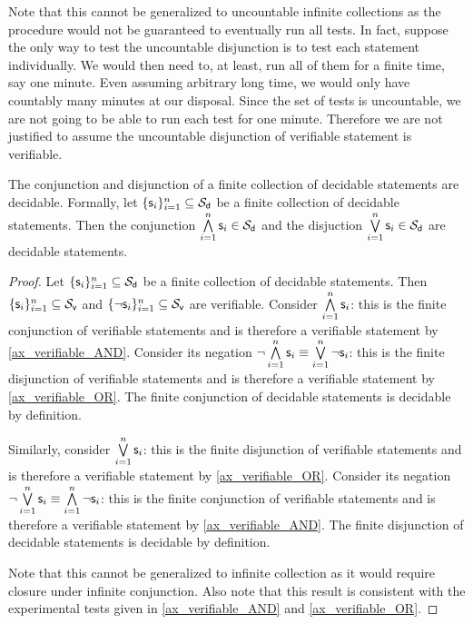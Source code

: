 \documentclass[11pt,letterpaper,fleqn]{memoir} %
\begin{document}
\begin{mathSection}
\begin{justification}
		Note that this cannot be generalized to uncountable infinite collections as the procedure would not be guaranteed to eventually run all tests. In fact, suppose the only way to test the uncountable disjunction is to test each statement individually. We would then need to, at least, run all of them for a finite time, say one minute. Even assuming arbitrary long time, we would only have countably many minutes at our disposal. Since the set of tests is uncountable, we are not going to be able to run each test for one minute. Therefore we are not justified to assume the uncountable disjunction of verifiable statement is verifiable.
	\end{justification}
	\begin{prop}\label{prop_decidable_AND_OR}
		The conjunction and disjunction of a finite collection of decidable statements are decidable. Formally, let $\{\mathsf{s}_i\}_{i=1}^{n} \subseteq \mathcal{S}_\textsf{d}$ be a finite collection of decidable statements. Then the conjunction $\bigwedge\limits_{i=1}^{n} \mathsf{s}_i \in \mathcal{S}_\textsf{d}$ and the disjuction $\bigvee\limits_{i=1}^{n} \mathsf{s}_i \in \mathcal{S}_\textsf{d}$ are decidable statements.
	\end{prop}
\begin{proof}
	Let $\{\mathsf{s}_i\}_{i=1}^{n} \subseteq \mathcal{S}_\textsf{d}$ be a finite collection of decidable statements. Then $\{\mathsf{s}_i\}_{i=1}^{n} \subseteq \mathcal{S}_\textsf{v}$ and $\{\neg\mathsf{s}_i\}_{i=1}^{n} \subseteq \mathcal{S}_\textsf{v}$ are verifiable. Consider $\bigwedge\limits_{i=1}^{n} \mathsf{s}_i$: this is the finite conjunction of verifiable statements and is therefore a verifiable statement by \ref{ax_verifiable_AND}. Consider its negation $\neg \bigwedge\limits_{i=1}^{n} \mathsf{s}_i \equiv \bigvee\limits_{i=1}^{n} \neg \mathsf{s}_i$: this is the finite disjunction of verifiable statements and is therefore a verifiable statement by \ref{ax_verifiable_OR}. The finite conjunction of decidable statements is decidable by definition.
	
	Similarly, consider $\bigvee\limits_{i=1}^{n} \mathsf{s}_i$: this is the finite disjunction of verifiable statements and is therefore a verifiable statement by \ref{ax_verifiable_OR}. Consider its negation $\neg \bigvee\limits_{i=1}^{n} \mathsf{s}_i \equiv \bigwedge\limits_{i=1}^{n} \neg \mathsf{s}_i$: this is the finite conjunction of verifiable statements and is therefore a verifiable statement by \ref{ax_verifiable_AND}. The finite disjunction of decidable statements is decidable by definition.
	
	Note that this cannot be generalized to infinite collection as it would require closure under infinite conjunction. Also note that this result is consistent with the experimental tests given in \ref{ax_verifiable_AND} and \ref{ax_verifiable_OR}.
\end{proof}
\end{mathSection}
\end{document}
